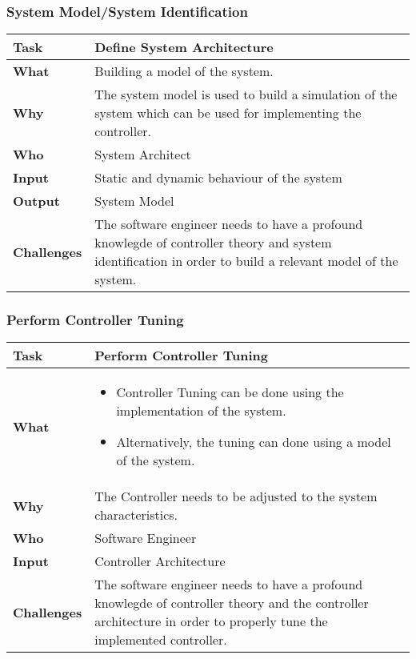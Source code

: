\subsubsection{System Model/System Identification}
	\begin{tabularx}{\textwidth}{@{} l X @{}}
		\caption{System Model/System Identification} \label{table:ch6_Task_Controler_Tuning}\\
		\toprule 
		\bfseries Task & Define System Architecture\\
		\midrule 
		\bfseries What & Building a model of the system.\\
		\midrule 
		\bfseries Why & The system model is used to build a simulation of the system which can be used for implementing the controller.\\
		\midrule 
		\bfseries Who & System Architect\\
		\midrule 
		\bfseries Input & Static and dynamic behaviour of the system\\ 
		\midrule 
		\bfseries Output & System Model\\
		\midrule 
		\bfseries Challenges & The software engineer needs to have a profound knowlegde of controller theory and system identification in order to build a relevant model of the system.
			\\
		\bottomrule 
	\end{tabularx}


\subsubsection{Perform Controller Tuning}
	\begin{tabularx}{\textwidth}{@{} l X @{}}
		\caption{Perform Controller Tuning} \label{table:ch6_Task_Perform_Controller_Tuning} \\
		\toprule 
		\bfseries Task & Perform Controller Tuning\\
		\midrule 
		\bfseries What & 
		\begin{itemize}
			\item Controller Tuning can be done using the implementation of the system.
			\item Alternatively, the tuning can done using a model of the system.
		\end{itemize}
		\\
		\midrule 
		\bfseries Why & The Controller needs to be adjusted to the system characteristics.\\
		\midrule 
		\bfseries Who & Software Engineer\\
		\midrule 
		\bfseries Input & Controller Architecture\\
		\midrule 
		\bfseries Challenges & The software engineer needs to have a profound knowlegde of controller theory and the controller architecture in order to properly tune the implemented controller.
		\\
		\bottomrule 
	\end{tabularx}


